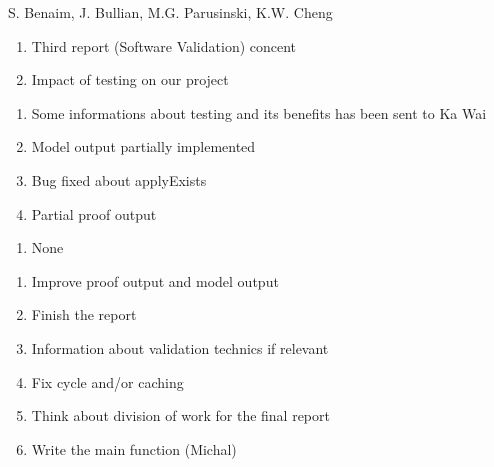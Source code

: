 %
{S. Benaim, J. Bullian, M.G. Parusinski, K.W. Cheng}%
{\begin{enumerate}
\item Third report (Software Validation) concent
\item Impact of testing on our project
\end{enumerate}
}%
{\begin{enumerate}
\item Some informations about testing and its benefits has been sent to Ka Wai
\item Model output partially implemented
\item Bug fixed about applyExists
\item Partial proof output
\end{enumerate}
}%
{\begin{enumerate}
\item None
\end{enumerate}
}
{\begin{enumerate}
\item Improve proof output and model output
\item Finish the report
\item Information about validation technics if relevant
\item Fix cycle and/or caching
\item Think about division of work for the final report
\item Write the main function (Michal)
\end{enumerate}}%

